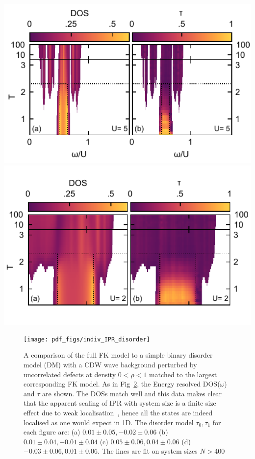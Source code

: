 \includegraphics[width=1\textwidth,height=\textheight]{figure_code/fk_chapter/gap_opening_high_U} \includegraphics[width=1\textwidth,height=\textheight]{figure_code/fk_chapter/gap_opening_low_U}

\begin{figure}
\hypertarget{fig:indiv_IPR_disorder}{%
\centering
\texttt{[image: pdf\_figs/indiv\_IPR\_disorder]}
\caption{A comparison of the full FK model to a simple binary disorder model (DM) with a CDW wave background perturbed by uncorrelated defects at density \(0 < \rho < 1\) matched to the largest corresponding FK model. As in Fig~\protect\hyperlink{fig:indiv_IPR}{2}, the Energy resolved DOS(\(\omega\)) and \(\tau\) are shown. The DOSs match well and this data makes clear that the apparent scaling of IPR with system size is a finite size effect due to weak localisation~\autocite{antipovInteractionTunedAndersonMott2016}, hence all the states are indeed localised as one would expect in 1D. The disorder model \(\tau_0,\tau_1\) for each figure are: (a) \(0.01\pm0.05, -0.02\pm0.06\) (b) \(0.01\pm0.04, -0.01\pm0.04\) (c) \(0.05\pm0.06, 0.04\pm0.06\) (d) \(-0.03\pm0.06, 0.01\pm0.06\). The lines are fit on system sizes \(N > 400\)}\label{fig:indiv_IPR_disorder}
}
\end{figure}

